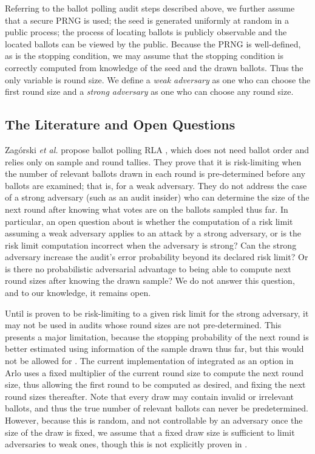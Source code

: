 Referring to the ballot polling audit steps described above, we further assume that a secure PRNG is used; the seed is generated uniformly at random in a public process; the process of locating ballots is publicly observable and the located ballots can be viewed by the public. Because the PRNG is well-defined, as is the stopping condition, we may assume that the stopping condition is correctly computed from knowledge of the seed and the drawn ballots. Thus the only variable is round size. We define a {\em weak adversary} as one who can choose the first round size and a {\em strong adversary} as one who can choose any round size. 

\subsection{The Literature and Open Questions}
Zag\'{o}rski {\em et al.} propose ballot polling RLA \Minerva \cite{usenix_minerva}, which does not need ballot order and relies only on sample and round tallies. They prove that it is risk-limiting when the number of relevant ballots drawn in each round is pre-determined before any ballots are examined; that is, for a weak adversary. They do not address the case of a strong adversary (such as an audit insider) who can determine the size of the next round after knowing what votes are on the ballots sampled thus far. In particular, an open question about \Minerva is whether the computation of a risk limit assuming a weak adversary applies to an attack by a strong adversary, or is the risk limit computation incorrect when the adversary is strong? Can the strong adversary increase the audit's error probability beyond its declared risk limit? Or is there no probabilistic adversarial advantage to being able to compute next round sizes after knowing the drawn sample? We do not answer this question, and to our knowledge, it remains open. 

Until \Minerva is proven to be risk-limiting to a given risk limit for the strong adversary, it may not be used in audits whose round sizes are not pre-determined. This presents a major limitation, because the stopping probability of the next round is better estimated using information of the sample drawn thus far, but this would not be allowed for \Minerva. The current implementation of \Minerva integrated as an option in Arlo uses a fixed multiplier of the current round size to compute the next round size, thus allowing the first round to be computed as desired, and fixing the next round sizes thereafter. Note that every draw may contain invalid or irrelevant ballots, and thus the true number of relevant ballots can never be predetermined. However, because this is random, and not controllable by an adversary once the size of the draw is fixed, we assume that a fixed draw size is sufficient to limit adversaries to weak ones, though this is not explicitly proven in \cite{usenix_minerva}. 

